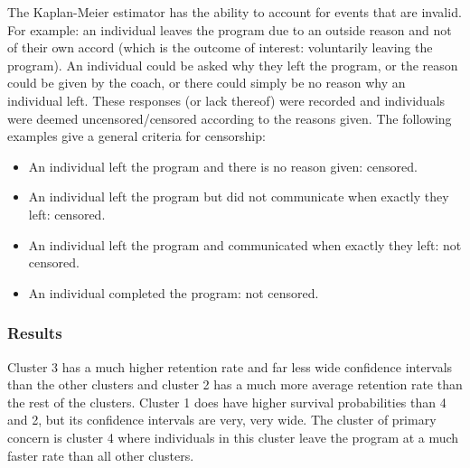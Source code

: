 \documentclass[12pt]{article}
\begin{document}
	The Kaplan-Meier estimator has the ability to account for events that are invalid. For example: an individual leaves the program due to an outside reason and not of their own accord (which is the outcome of interest: voluntarily leaving the program). An individual could be asked why they left the program, or the reason could be given by the coach, or there could simply be no reason why an individual left. These responses (or lack thereof) were recorded and individuals were deemed uncensored/censored according to the reasons given. The following examples give a general criteria for censorship:
	\begin{itemize}
		\item An individual left the program and there is no reason given: censored.
		\item An individual left the program but did not communicate when exactly they left: censored.
		\item An individual left the program and communicated when exactly they left: not censored.
		\item An individual completed the program: not censored.
	\end{itemize}
	
	\subsubsection{Results}
	
	Cluster 3 has a much higher retention rate and far less wide confidence intervals than the other clusters and cluster 2 has a much more average retention rate than the rest of the clusters. Cluster 1 does have higher survival probabilities than 4 and 2, but its confidence intervals are very, very wide. The cluster of primary concern is cluster 4 where individuals in this cluster leave the program at a much faster rate than all other clusters.
	
\end{document}
